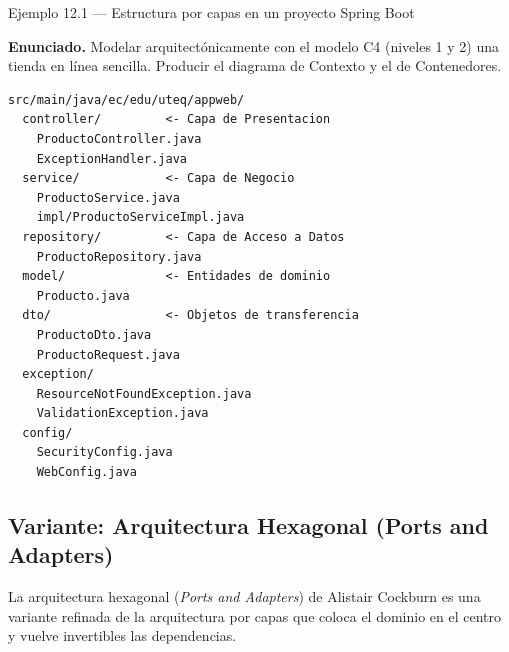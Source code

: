 \begin{cajaejemplo}{Ejemplo 12.1 --- Estructura por capas en un proyecto Spring Boot}

\textbf{Enunciado.} Modelar arquitectónicamente con el modelo C4 (niveles 1 y 2) una tienda en línea sencilla. Producir el diagrama de Contexto y el de Contenedores.

\begin{lstlisting}[style=shell,numbers=none,caption={Ejemplo de Shell},label=lst:12.1]
src/main/java/ec/edu/uteq/appweb/
  controller/         <- Capa de Presentacion
    ProductoController.java
    ExceptionHandler.java
  service/            <- Capa de Negocio
    ProductoService.java
    impl/ProductoServiceImpl.java
  repository/         <- Capa de Acceso a Datos
    ProductoRepository.java
  model/              <- Entidades de dominio
    Producto.java
  dto/                <- Objetos de transferencia
    ProductoDto.java
    ProductoRequest.java
  exception/
    ResourceNotFoundException.java
    ValidationException.java
  config/
    SecurityConfig.java
    WebConfig.java
\end{lstlisting}
\end{cajaejemplo}

\subsection{Variante: Arquitectura Hexagonal (Ports and Adapters)}

La arquitectura hexagonal (\emph{Ports and Adapters}) de
Alistair Cockburn es una variante refinada de la arquitectura por
capas que coloca el dominio en el centro y vuelve invertibles las
dependencias.


